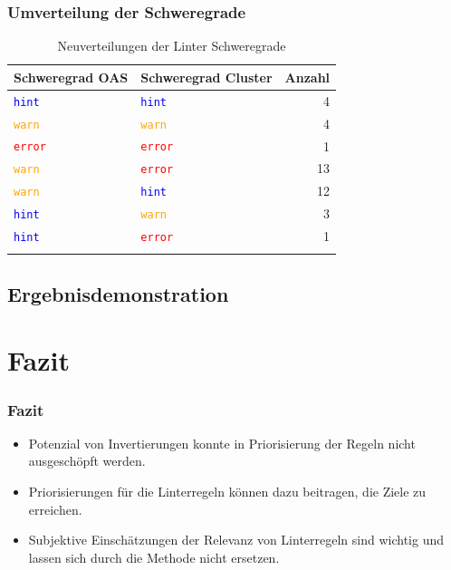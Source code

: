 \begin{frame}
  \frametitle{Umverteilung der Schweregrade}
  \begin{longtable}{llr}
    \label{tab:severityreassignments}
    \endfirsthead
    \endhead
    \textbf{Schweregrad OAS} & \textbf{Schweregrad Cluster} & \textbf{Anzahl} \\ \hline
    \textcolor{blue}{\texttt{hint}} & \textcolor{blue}{\texttt{hint}} & 4 \\
    \textcolor{orange}{\texttt{warn}} & \textcolor{orange}{\texttt{warn}} & 4 \\
    \textcolor{red}{\texttt{error}} & \textcolor{red}{\texttt{error}} & 1 \\
    \textcolor{orange}{\texttt{warn}} & \textcolor{red}{\texttt{error}} & 13 \\
    \textcolor{orange}{\texttt{warn}} & \textcolor{blue}{\texttt{hint}} & 12 \\
    \textcolor{blue}{\texttt{hint}} & \textcolor{orange}{\texttt{warn}} & 3 \\
    \textcolor{blue}{\texttt{hint}} & \textcolor{red}{\texttt{error}} & 1 \\
  \caption{Neuverteilungen der Linter Schweregrade}
  \end{longtable}
\end{frame}

\subsection{Ergebnisdemonstration}
\begin{frame}
\end{frame}

\section{Fazit}
\begin{frame}
  \frametitle{Fazit}
  \begin{itemize}
    \item Potenzial von Invertierungen konnte in Priorisierung der Regeln nicht ausgeschöpft werden.
    \item Priorisierungen für die Linterregeln können dazu beitragen, die Ziele zu erreichen.
    \item Subjektive Einschätzungen der Relevanz von Linterregeln sind wichtig und lassen sich durch die Methode nicht ersetzen.
  \end{itemize}
\end{frame}